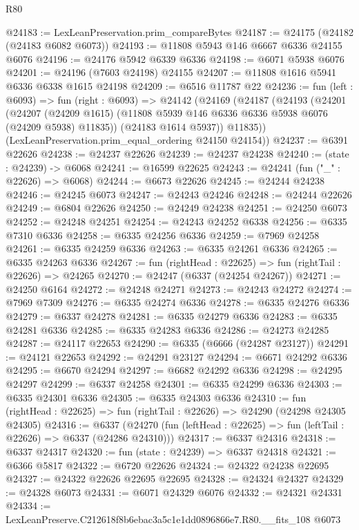 \begin{lexlean}{R80}
\begin{coremodule}
@24183 := LexLeanPreservation.prim_compareBytes
@24187 := @24175 (@24182 (@24183 @6082 @6073))
@24193 := @11808 @5943 @146 @6667 @6336 @24155 @6076
@24196 := @24176 @5942 @6339 @6336
@24198 := @6071 @5938 @6076
@24201 := @24196 (@7603 @24198) @24155
@24207 := @11808 @1616 @5941 @6336 @6338 @1615 @24198
@24209 := @6516 @11787 @22
@24236 := fun (left : @6093) =>
  fun (right : @6093) =>
  @24142
    (@24169
      (@24187
        (@24193
          (@24201
            (@24207
              (@24209 @1615)
              (@11808 @5939 @146 @6336 @6336 @5938 @6076 (@24209 @5938) @11835))
            (@24183 @1614 @5937))
          @11835))
      (LexLeanPreservation.prim_equal_ordering @24150 @24154))
@24237 := @6391 @22626
@24238 := @24237 @22626
@24239 := @24237 @24238
@24240 := (state : @24239) -> @6068
@24241 := @16599 @22625
@24243 := @24241 (fun ("_" : @22626) => @6068)
@24244 := @6673 @22626
@24245 := @24244 @24238
@24246 := @24245 @6073
@24247 := @24243 @24246
@24248 := @24244 @22626
@24249 := @6804 @22626
@24250 := @24249 @24238
@24251 := @24250 @6073
@24252 := @24248 @24251
@24254 := @24243 @24252 @6338
@24256 := @6335 @7310 @6336
@24258 := @6335 @24256 @6336
@24259 := @7969 @24258
@24261 := @6335 @24259 @6336
@24263 := @6335 @24261 @6336
@24265 := @6335 @24263 @6336
@24267 := fun (rightHead : @22625) => fun (rightTail : @22626) => @24265
@24270 := @24247 (@6337 (@24254 @24267))
@24271 := @24250 @6164
@24272 := @24248 @24271
@24273 := @24243 @24272
@24274 := @7969 @7309
@24276 := @6335 @24274 @6336
@24278 := @6335 @24276 @6336
@24279 := @6337 @24278
@24281 := @6335 @24279 @6336
@24283 := @6335 @24281 @6336
@24285 := @6335 @24283 @6336
@24286 := @24273 @24285
@24287 := @24117 @22653
@24290 := @6335 (@6666 (@24287 @23127))
@24291 := @24121 @22653
@24292 := @24291 @23127
@24294 := @6671 @24292 @6336
@24295 := @6670 @24294
@24297 := @6682 @24292 @6336
@24298 := @24295 @24297
@24299 := @6337 @24258
@24301 := @6335 @24299 @6336
@24303 := @6335 @24301 @6336
@24305 := @6335 @24303 @6336
@24310 := fun (rightHead : @22625) => fun (rightTail : @22626) => @24290 (@24298 @24305 @24305)
@24316 := @6337
    (@24270 (fun (leftHead : @22625) => fun (leftTail : @22626) => @6337 (@24286 @24310)))
@24317 := @6337 @24316
@24318 := @6337 @24317
@24320 := fun (state : @24239) => @6337 @24318
@24321 := @6366 @5817
@24322 := @6720 @22626
@24324 := @24322 @24238 @22695
@24327 := @24322 @22626 @22695 @22695
@24328 := @24324 @24327
@24329 := @24328 @6073
@24331 := @6071 @24329 @6076
@24332 := @24321 @24331
@24334 := LexLeanPreserve.C212618f8b6ebac3a5c1e1dd0896866e7.R80.__fits_108 @6073

\end{coremodule}
\end{lexlean}
